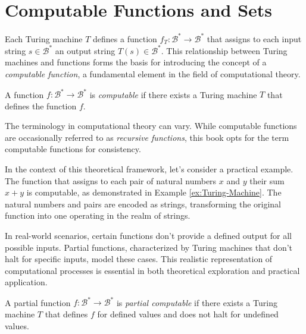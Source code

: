 %
%

\section{Computable Functions and Sets}
\label{sec:computable_functions}

Each Turing machine \(T\) defines a function \(f_T:\mathcal{B}^{\ast} \rightarrow \mathcal{B}^{\ast}\) that assigns to each input string \(s \in \mathcal{B}^{\ast}\) an output string \(T(s) \in \mathcal{B}^{\ast}\). This relationship between Turing machines and functions forms the basis for introducing the concept of a \emph{computable function}, a fundamental element in the field of computational theory.

\begin{definition}
\label{def:computable-function}
A function \(f: \mathcal{B}^{\ast} \rightarrow \mathcal{B}^{\ast}\) is \emph{computable} if there exists a Turing machine \(T\) that defines the function \(f\).
\end{definition}

The terminology in computational theory can vary. While computable functions are occasionally referred to as \emph{recursive functions}, this book opts for the term computable functions for consistency.

\begin{example}
In the context of this theoretical framework, let’s consider a practical example. The function that assigns to each pair of natural numbers \(x\) and \(y\) their sum \(x + y\) is computable, as demonstrated in Example \ref{ex:Turing-Machine}. The natural numbers and pairs are encoded as strings, transforming the original function into one operating in the realm of strings.
\end{example}

In real-world scenarios, certain functions don’t provide a defined output for all possible inputs. Partial functions, characterized by Turing machines that don’t halt for specific inputs, model these cases. This realistic representation of computational processes is essential in both theoretical exploration and practical application.

\begin{definition}
A partial function \(f:\mathcal{B}^{\ast} \rightarrow \mathcal{B}^{\ast}\) is \emph{partial computable} if there exists a Turing machine \(T\) that defines \(f\) for defined values and does not halt for undefined values.
\end{definition}

